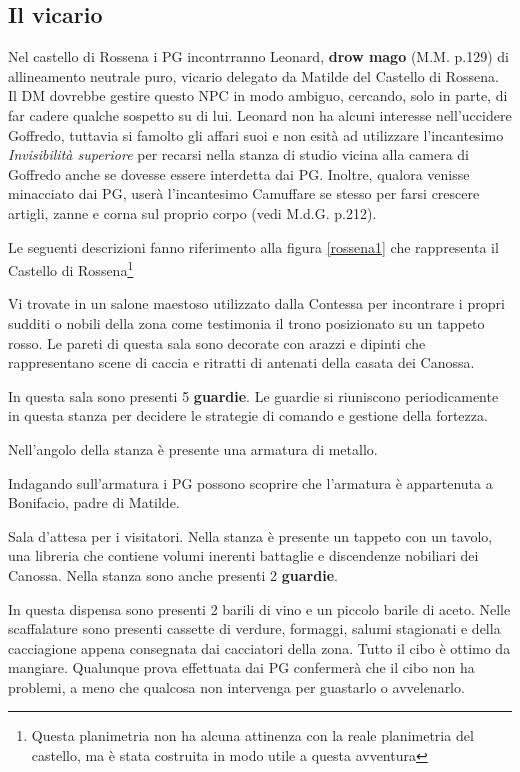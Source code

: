 \documentclass[letterpaper,twocolumn,openany,nodeprecatedcode]{dndbook}
\begin{document}
\subsection{Il vicario}
Nel castello di Rossena i PG incontrranno Leonard, \textbf{drow mago} (M.M. p.129) di allineamento neutrale puro, vicario delegato da Matilde del Castello di Rossena. Il DM dovrebbe gestire questo NPC in modo ambiguo, cercando, solo in parte, di far cadere qualche sospetto su di lui. Leonard non ha alcuni interesse nell'uccidere Goffredo, tuttavia si famolto gli affari suoi e non esità ad utilizzare l'incantesimo \textit{Invisibilità superiore} per recarsi nella stanza di studio vicina alla camera di Goffredo anche se dovesse essere interdetta dai PG. Inoltre, qualora venisse minacciato dai PG, userà l'incantesimo Camuffare se stesso per farsi crescere artigli, zanne e corna sul proprio corpo (vedi M.d.G. p.212\cite{dnd:giocatore}).

Le seguenti descrizioni fanno riferimento alla figura \ref{rossena1} che rappresenta il Castello di Rossena\footnote{Questa planimetria non ha alcuna attinenza con la reale planimetria del castello, ma è stata costruita in modo utile a questa avventura}

\begin{DndReadAloud}
Vi trovate in un salone maestoso utilizzato dalla Contessa per incontrare i propri sudditi o nobili della zona come testimonia il trono posizionato su un tappeto rosso. Le pareti di questa sala sono decorate con arazzi e dipinti che rappresentano scene di caccia e ritratti di antenati della casata dei Canossa.
\end{DndReadAloud}

In questa sala sono presenti 5 \textbf{guardie}. Le guardie si riuniscono periodicamente in questa stanza per decidere le strategie di comando e gestione della fortezza.

Nell'angolo della stanza è presente una armatura di metallo.

Indagando sull'armatura i PG possono scoprire che l'armatura è appartenuta a Bonifacio, padre di Matilde.

Sala d'attesa per i visitatori. Nella stanza è presente un tappeto con un tavolo, una libreria che contiene volumi inerenti battaglie e discendenze nobiliari dei Canossa.
Nella stanza sono anche presenti 2 \textbf{guardie}.

In questa dispensa sono presenti 2 barili di vino e un piccolo barile di aceto. Nelle scaffalature sono presenti cassette di verdure, formaggi, salumi stagionati e della cacciagione appena consegnata dai cacciatori della zona. Tutto il cibo è ottimo da mangiare. Qualunque prova effettuata dai PG confermerà che il cibo non ha problemi, a meno che qualcosa non intervenga per guastarlo o avvelenarlo.
\end{document}
